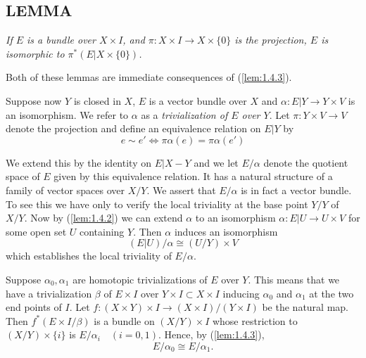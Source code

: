 \subsection{LEMMA}\label{lem:1.4.5} \textit{If $E$ is a bundle over $X \times I$, and $\pi: X \times I \to X \times \{0\}$ is the projection, $E$ is isomorphic to $\pi^*(E \vert X \times \{0\})$.} \par 

Both of these lemmas are immediate consequences of (\ref{lem:1.4.3}). \par \hfill

Suppose now $Y$ is closed in $X$, $E$ is a vector bundle over $X$ and $\alpha: E \vert Y \to Y \times V$ is an isomorphism. We refer to $\alpha$ as a \textit{trivialization of $E$ over $Y$}. Let $\pi: Y \times V \to V$ denote the projection and define an equivalence relation on $E \vert Y$ by
\begin{equation*}
    e \sim e' \iff \pi \alpha (e) = \pi \alpha (e')
\end{equation*}

We extend this by the identity on $E \vert X - Y$ and we let $E/\alpha$ denote the quotient space of $E$ given by this equivalence relation. It has a natural structure of a family of vector spaces over $X/Y$. We assert that $E/\alpha$ is in fact a vector bundle. To see this we have only to verify the local triviality at the base point $Y/Y$ of $X/Y$. Now by (\ref{lem:1.4.2}) we can extend $\alpha$ to an isomorphism $\alpha: E \vert U \to U \times V$ for some open set $U$ containing $Y$. Then $\alpha$ induces an isomorphism
\begin{equation*}
    (E \vert U) / \alpha \cong (U/Y) \times V
\end{equation*}
which establishes the local triviality of $E/\alpha$. \par

Suppose $\alpha_0, \alpha_1$ are homotopic trivializations of $E$ over $Y$. This means that we have a trivialization $\beta$ of $E \times I$ over $Y \times I \subset X \times I$ inducing $\alpha_0$ and $\alpha_1$ at the two end points of $I$. Let $f: (X \times Y) \times I \to (X \times I)/(Y \times I)$ be the natural map. Then $f^*(E \times I/\beta)$ is a bundle on $(X/Y) \times I$ whose restriction to $(X/Y) \times \{i\}$ is $E/\alpha_i \quad (i = 0, 1)$. Hence, by (\ref{lem:1.4.3}),
\begin{equation*}
    E/\alpha_0 \cong  E/\alpha_1.
\end{equation*}

